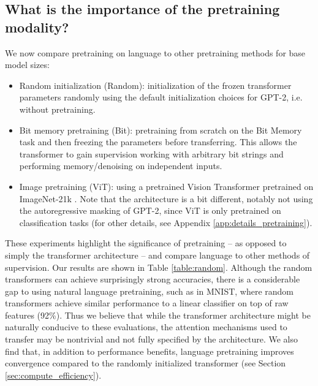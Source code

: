 \subsection{What is the importance of the pretraining modality?}
\label{sec:pretraining}

We now compare pretraining on language to other pretraining methods for base model sizes:
\begin{itemize}[leftmargin=*]
    \item Random initialization (Random): initialization of the frozen transformer parameters randomly using the default initialization choices for GPT-2, i.e. without pretraining.
    
    \item Bit memory pretraining (Bit): pretraining from scratch on the Bit Memory task and then freezing the parameters before transferring.
    This allows the transformer to gain supervision working with arbitrary bit strings and performing memory/denoising on independent inputs.
    
    \item Image pretraining (ViT): using a pretrained Vision Transformer \citep{dosovitskiy2020vit} pretrained on ImageNet-21k \citep{deng2009imagenet}.
    Note that the architecture is a bit different, notably not using the autoregressive masking of GPT-2, since ViT is only pretrained on classification tasks (for other details, see Appendix \ref{app:details_pretraining}). 
\end{itemize}

These experiments highlight the significance of pretraining -- as opposed to simply the transformer architecture -- and compare language to other methods of supervision.
Our results are shown in Table \ref{table:random}.
Although the random transformers can achieve surprisingly strong accuracies, there is a considerable gap to using natural language pretraining, such as in MNIST, where random transformers achieve similar performance to a linear classifier on top of raw features (92\%).
Thus we believe that while the transformer architecture might be naturally conducive to these evaluations, the attention mechanisms used to transfer may be nontrivial and not fully specified by the architecture.
We also find that, in addition to performance benefits, language pretraining improves convergence compared to the randomly initialized transformer (see Section \ref{sec:compute_efficiency}).

